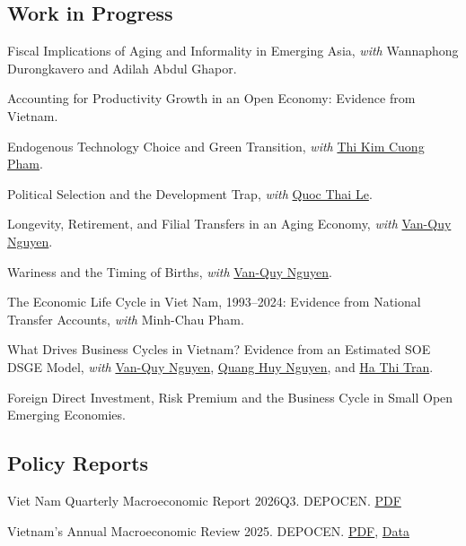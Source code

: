\documentclass[12pt]{article}
\begin{document}
\subsection{Work in Progress}
\begin{enumerate}[label={[\arabic*]}]
\item Fiscal Implications of Aging and Informality in Emerging Asia, \textit{with} Wannaphong Durongkavero and Adilah Abdul Ghapor.
\item Accounting for Productivity Growth in an Open Economy: Evidence from Vietnam.
\item Endogenous Technology Choice and Green Transition, \textit{with} \href{https://economix.fr/en/membre/pham-thi-kim-cuong}{Thi Kim Cuong Pham}.
\item Political Selection and the Development Trap, \textit{with} \href{https://sites.google.com/view/quocthaile/homepage/research?authuser=0}{Quoc Thai Le}.
\item Longevity, Retirement, and Filial Transfers in an Aging Economy, \textit{with} \href{https://sites.google.com/view/vanquy93/}{Van-Quy Nguyen}.
\item Wariness and the Timing of Births, \textit{with} \href{https://sites.google.com/view/vanquy93/}{Van-Quy Nguyen}.
\item The Economic Life Cycle in Viet Nam, 1993--2024: Evidence from National Transfer Accounts, \textit{with} Minh-Chau Pham.
\item What Drives Business Cycles in Vietnam? Evidence from an Estimated SOE DSGE Model, \textit{with} \href{https://sites.google.com/view/vanquy93/}{Van-Quy Nguyen}, \href{https://mfe.neu.edu.vn/nguyenquanghuy/}{Quang Huy Nguyen}, and \href{https://mfe.neu.edu.vn/tranthiha/}{Ha Thi Tran}.
\item Foreign Direct Investment, Risk Premium and the Business Cycle in Small Open Emerging Economies.
\end{enumerate}

\subsection{Policy Reports}
\begin{enumerate}[label={[\arabic*]}]
\item Viet Nam Quarterly Macroeconomic Report 2026Q3. DEPOCEN. \href{https://depocenwp.org/modules/reports/view.php?id=1}{PDF}
\item Vietnam's Annual Macroeconomic Review 2025. DEPOCEN. \href{https://depocenwp.org/modules/reports/view.php?id=2}{PDF}, \href{https://data.mendeley.com/datasets/r9g78zx8vc/2}{Data}
\end{enumerate}
\end{document}

